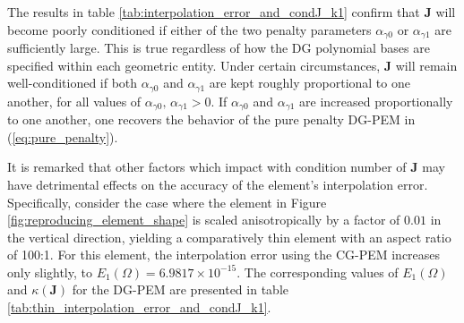 The results in table \ref{tab:interpolation_error_and_condJ_k1} confirm that $\mathbf{J}$ will become poorly conditioned if either of the two penalty parameters $\alpha_{\gamma0}$ or $\alpha_{\gamma1}$ are sufficiently large. This is true regardless of how the DG polynomial bases are specified within each geometric entity. Under certain circumstances, $\mathbf{J}$ will remain well-conditioned if both $\alpha_{\gamma0}$ and $\alpha_{\gamma1}$ are kept roughly proportional to one another, for all values of $\alpha_{\gamma0}, \, \alpha_{\gamma1} > 0$. If $\alpha_{\gamma0}$ and $\alpha_{\gamma1}$ are increased proportionally to one another, one recovers the behavior of the pure penalty DG-PEM in (\ref{eq:pure_penalty}).

It is remarked that other factors which impact with condition number of $\mathbf{J}$ may have detrimental effects on the accuracy of the element's interpolation error. Specifically, consider the case where the element in Figure \ref{fig:reproducing_element_shape} is scaled anisotropically by a factor of $0.01$ in the vertical direction, yielding a comparatively thin element with an aspect ratio of 100:1. For this element, the interpolation error using the CG-PEM increases only slightly, to $E_1 (\Omega) = 6.9817 \times 10^{-15}$. The corresponding values of $E_1 (\Omega)$ and $\kappa(\mathbf{J})$ for the DG-PEM are presented in table \ref{tab:thin_interpolation_error_and_condJ_k1}.


